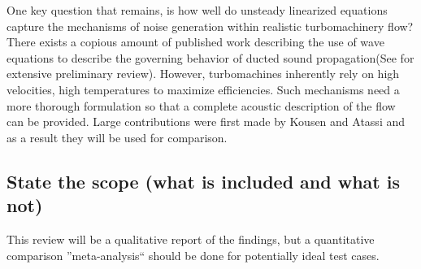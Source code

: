 One key question that remains, is how well do unsteady linearized equations capture the mechanisms of noise generation within realistic turbomachinery flow? There exists a copious amount of published work describing the use of wave equations to describe the governing behavior of ducted sound propagation(See \cite{Michel2008} for extensive preliminary review). However, turbomachines inherently rely on high velocities, high temperatures to maximize efficiencies. Such mechanisms need a more thorough formulation so that a complete acoustic description of the flow can be provided. Large contributions were first made by Kousen and Atassi and as a result they will be used for comparison.

\subsection{State the scope (what is included and what is not)}
This review will be a qualitative report of the findings, but a quantitative comparison ''meta-analysis`` should be done for potentially ideal test cases.
